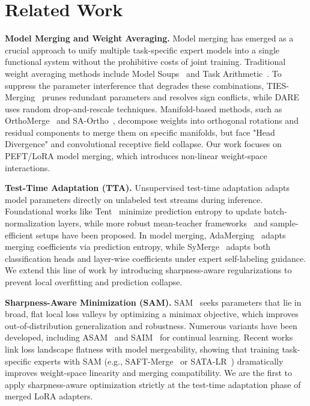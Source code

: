 \documentclass{article}
\theoremstyle{plain}
\theoremstyle{definition}
\theoremstyle{remark}
\begin{document}
\section{Related Work}
\label{submission-related-work}

\textbf{Model Merging and Weight Averaging.} Model merging has emerged as a crucial approach to unify multiple task-specific expert models into a single functional system without the prohibitive costs of joint training. Traditional weight averaging methods include Model Soups~\cite{wortsman2022model} and Task Arithmetic~\cite{ilharco2022editing}. To suppress the parameter interference that degrades these combinations, TIES-Merging~\cite{yadav2023ties} prunes redundant parameters and resolves sign conflicts, while DARE~\cite{yu2024dare} uses random drop-and-rescale techniques. Manifold-based methods, such as OrthoMerge~\cite{yang2026orthogonal} and SA-Ortho~\cite{anonymous2026saortho}, decompose weights into orthogonal rotations and residual components to merge them on specific manifolds, but face "Head Divergence" and convolutional receptive field collapse. Our work focuses on PEFT/LoRA model merging, which introduces non-linear weight-space interactions.

\textbf{Test-Time Adaptation (TTA).} Unsupervised test-time adaptation adapts model parameters directly on unlabeled test streams during inference. Foundational works like Tent~\cite{wang2020tent} minimize prediction entropy to update batch-normalization layers, while more robust mean-teacher frameworks~\cite{dobler2022robust} and sample-efficient setups have been proposed. In model merging, AdaMerging~\cite{yang2024adamerging} adapts merging coefficients via prediction entropy, while SyMerge~\cite{jung2025symerge} adapts both classification heads and layer-wise coefficients under expert self-labeling guidance. We extend this line of work by introducing sharpness-aware regularizations to prevent local overfitting and prediction collapse.

\textbf{Sharpness-Aware Minimization (SAM).} SAM~\cite{foret2020sharpness} seeks parameters that lie in broad, flat local loss valleys by optimizing a minimax objective, which improves out-of-distribution generalization and robustness. Numerous variants have been developed, including ASAM~\cite{kwon2021asam} and SAIM~\cite{anonymous2026saim} for continual learning. Recent works link loss landscape flatness with model mergeability, showing that training task-specific experts with SAM (e.g., SAFT-Merge~\cite{lee2025mitigating} or SATA-LR~\cite{anonymous2026flatter}) dramatically improves weight-space linearity and merging compatibility. We are the first to apply sharpness-aware optimization strictly at the test-time adaptation phase of merged LoRA adapters.
\end{document}
